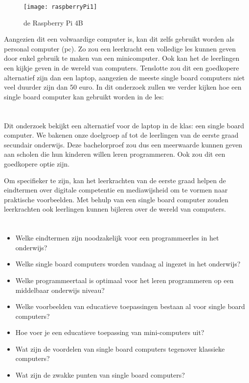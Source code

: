 \begin{figure}
    \texttt{[image: raspberryPi1]}
    \caption{de Raspberry Pi 4B}
    \label{fig:raspberryPi1}
\end{figure}

Aangezien dit een volwaardige computer is, kan dit zelfs gebruikt worden als personal computer (pc). Zo zou een leerkracht een volledige les kunnen geven door enkel gebruik te maken van een minicomputer. Ook kan het de leerlingen een kijkje geven in de wereld van computers. Tenslotte zou dit een goedkopere alternatief zijn dan een laptop, aangezien de meeste single board computers niet veel duurder zijn dan 50 euro.
In dit onderzoek zullen we verder kijken hoe een single board computer kan gebruikt worden in de les:

\section{}
\label{sec:probleemstelling}

Dit onderzoek bekijkt een alternatief voor de laptop in de klas: een single board computer. We bakenen onze doelgroep af tot de leerlingen van de eerste graad secundair onderwijs. Deze bachelorproef zou dus een meerwaarde kunnen geven aan scholen die hun kinderen willen leren programmeren. Ook zou dit een goedkopere optie zijn. 

Om specifieker te zijn, kan het leerkrachten van de eerste graad helpen de eindtermen over digitale competentie en mediawijsheid om te vormen naar praktische voorbeelden. Met behulp van een single board computer zouden leerkrachten ook leerlingen kunnen bijleren over de wereld van computers.

\section{}
\label{sec:onderzoeksvraag}

\begin{itemize}
    \item Welke eindtermen zijn noodzakelijk voor een programmeerles in het onderwijs?
    \item Welke single board computers worden vandaag al ingezet in het onderwijs?
    \item Welke programmeertaal is optimaal voor het leren programmeren op een middelbaar onderwijs niveau?
    \item Welke voorbeelden van educatieve toepassingen bestaan al voor single board computers?
    \item Hoe voer je een educatieve toepassing van mini-computers uit?
    \item Wat zijn de voordelen van single board computers tegenover klassieke computers?
    \item Wat zijn de zwakke punten van single board computers?
\end{itemize}

